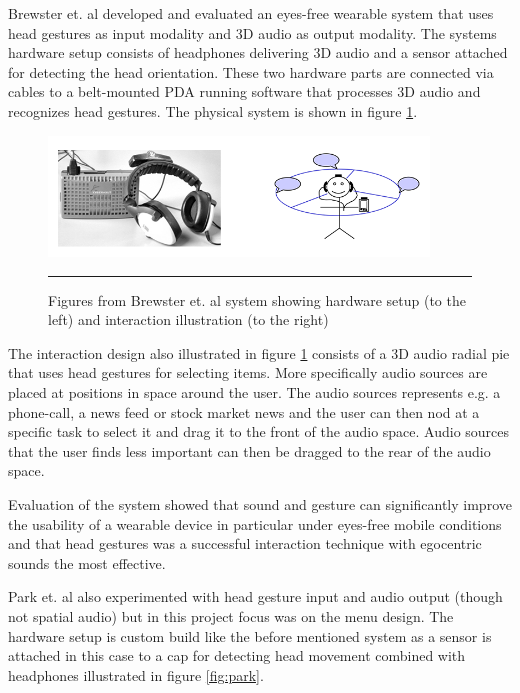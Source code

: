 Brewster et. al \cite{brewster_multimodaleyes-freeinteraction_2003} developed and evaluated an eyes-free wearable system that uses head gestures as input modality and 3D audio as output modality. The systems hardware setup consists of headphones delivering 3D audio and a sensor attached for detecting the head orientation. These two hardware parts are connected via cables to a belt-mounted PDA running software that processes 3D audio and recognizes head gestures. The physical system is shown in figure \ref{fig:brewster}.

\begin{figure}[htbp]
	\centering
		\includegraphics[width=0.9\textwidth,height=\textheight,keepaspectratio]{./Figures/brewster-system.png}
		\rule{35em}{0.5pt}
	\caption[Brewster system]{Figures from Brewster et. al \cite{brewster_multimodaleyes-freeinteraction_2003} system showing hardware setup (to the left) and interaction illustration (to the right)}
	\label{fig:brewster}
\end{figure}

The interaction design also illustrated in figure \ref{fig:brewster} consists of a 3D audio radial pie that uses head gestures for selecting items. More specifically audio sources are placed at positions in space around the user. The audio sources represents e.g. a phone-call, a news feed or stock market news and the user can then nod at a specific task to select it and drag it to the front of the audio space. Audio sources that the user finds less important can then be dragged to the rear of the audio space.

Evaluation of the system showed that sound and gesture can significantly improve the usability of a wearable device in particular under eyes-free mobile conditions and that head gestures was a successful interaction technique with egocentric sounds the most effective.


Park et. al \cite{park_gaze-directed_2011} also experimented with head gesture input and audio output (though not spatial audio) but in this project focus was on the menu design. The hardware setup is custom build like the before mentioned system as a sensor is attached in this case to a cap for detecting head movement combined with headphones illustrated in figure \ref{fig:park}.

